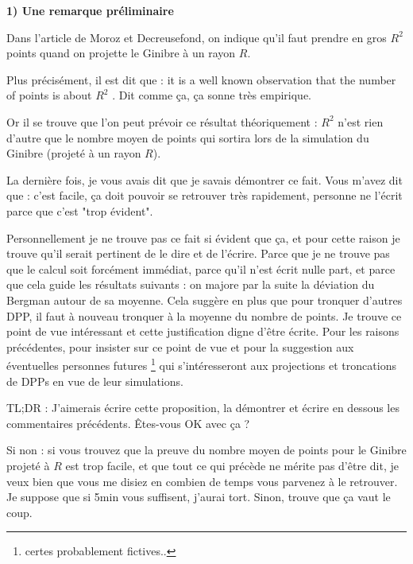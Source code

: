 \documentclass[11pt]{article}
\begin{document}



\textbf{1) Une remarque préliminaire}

Dans l'article de Moroz et Decreusefond, on indique qu'il faut prendre en gros $R^2$ points quand on projette le Ginibre à un rayon $R$.

Plus précisément, il est dit que : \og it is a well known observation that the number of points is about $R^2$ \fg. Dit comme ça, ça sonne très empirique. 

Or il se trouve que l'on peut prévoir ce résultat théoriquement : $ R^2 $ n'est rien d'autre que le nombre moyen de points qui sortira lors de la simulation du Ginibre (projeté à un rayon $R$). 

La dernière fois, je vous avais dit que je savais démontrer ce fait. Vous m'avez dit que : c'est facile, ça doit pouvoir se retrouver très rapidement, personne ne l'écrit parce que c'est "trop évident".

Personnellement je ne trouve pas ce fait si évident que ça, et pour cette raison je trouve qu'il serait pertinent de le dire et de l'écrire. Parce que je ne trouve pas que le calcul soit forcément immédiat, parce qu'il n'est écrit nulle part, et parce que cela guide les résultats suivants : on majore par la suite la déviation du Bergman autour de sa moyenne. Cela suggère en plus que pour tronquer d'autres DPP, il faut à nouveau tronquer à la moyenne du nombre de points. Je trouve ce point de vue intéressant et cette justification digne d'être écrite. Pour les raisons précédentes, pour insister sur ce point de vue et pour la suggestion aux éventuelles personnes futures \footnote{certes probablement fictives..} qui s'intéresseront aux projections et troncations de DPPs en vue de leur simulations.

TL;DR : J'aimerais écrire cette proposition, la démontrer et écrire en dessous les commentaires précédents. Êtes-vous OK avec ça ?

Si non : si vous trouvez que la preuve du nombre moyen de points pour le Ginibre projeté à $R$ est trop facile, et que tout ce qui précède ne mérite pas d'être dit, je veux bien que vous me disiez en combien de temps vous parvenez à le retrouver. Je suppose que si 5min vous suffisent, j'aurai tort. Sinon, trouve que ça vaut le coup.
\end{document}
